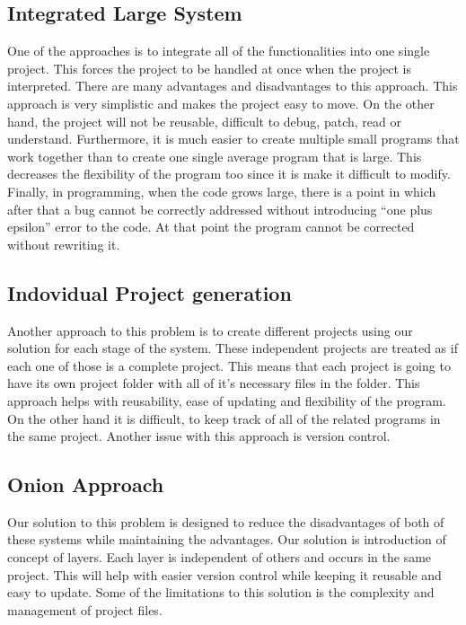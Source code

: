 \documentclass[journal,10pt,onecolumn,compsoc]{IEEEtran} \usepackage[margin=1.0in]{geometry} \usepackage{pdfpages} \usepackage{graphicx}
\begin{document}
\subsection{Integrated Large System}
One of the approaches is to integrate all of the functionalities into one single project. 
This forces the project to be handled at once when the project is interpreted. 
There are many advantages and disadvantages to this approach. 
This approach is very simplistic and makes the project easy to move. 
On the other hand, the project will not be reusable, difficult to debug, patch, read or understand. 
Furthermore, it is much easier to create multiple small programs that work together than to create one single average program that is large. 
This decreases the flexibility of the program too since it is make it difficult to modify. 
Finally, in programming, when the code grows large, there is a point in which after that a bug cannot be correctly addressed without introducing “one plus epsilon” error to the code. \cite{criticalmass}
At that point the program cannot be corrected without rewriting it.

\subsection{Indovidual Project generation}
Another approach to this problem is to create different projects using our solution for each stage of the system. 
These independent projects are treated as if each one of those is a complete project. 
This means that each project is going to have its own project folder with all of it’s necessary files in the folder. 
This approach helps with reusability, ease of updating and flexibility of the program. On the other hand it is difficult, to keep track of all of the related programs in the same project. 
Another issue with this approach is version control. 

\subsection{Onion Approach}
Our solution to this problem is designed to reduce the disadvantages of both of these systems while maintaining the advantages. 
Our solution is introduction of concept of layers. 
Each layer is independent of others and occurs in the same project. 
This will help with easier version control while keeping it reusable and easy to update. 
Some of the limitations to this solution is the complexity and management of project files. 
\end{document}
